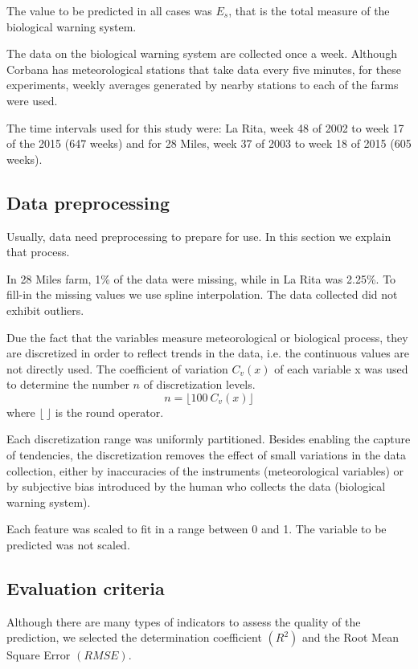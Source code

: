 \documentclass[review,authoryear,english]{elsarticle}
\begin{document}
The value to be predicted in all cases was $E_s$, that is the total measure of the biological warning system.  

The data on the biological warning system are collected once a week. Although Corbana has meteorological stations that take data every five minutes, for these experiments, weekly averages generated by nearby stations to each of the farms were used.

The time intervals used for this study were: La Rita, week 48 of 2002 to week 17 of the 2015 (647 weeks) and for 28 Miles, week 37 of 2003 to week 18 of 2015 (605 weeks).

\subsection{Data preprocessing}
Usually, data need preprocessing to prepare for use. In this section we explain that process.

In 28 Miles farm, 1\% of the data were missing, while in La Rita was 2.25\%. To fill-in the missing values we use spline interpolation. The data collected did not exhibit outliers.

Due the fact that the variables measure meteorological or biological process, they are discretized in order to reflect trends in the data, i.e. the continuous values are not directly used. The coefficient of variation $C_v(x)$ of each variable x was used to determine the number $n$ of discretization levels.
$$n= \lfloor 100 \ C_v(x) \rfloor$$
where $\lfloor \ \rfloor$  is the round operator.

Each discretization range was uniformly partitioned. Besides enabling the capture of tendencies, the discretization removes the effect of small variations in the data collection, either by inaccuracies of the instruments (meteorological variables) or by subjective bias introduced by the human who collects the data (biological warning system). 

Each feature was scaled to fit in a range between 0 and 1. The variable to be predicted was not scaled.

\subsection{Evaluation criteria}

Although there are many types of indicators to assess the quality of the prediction, we selected the determination coefficient $(R^2)$ and the Root Mean Square Error $(RMSE)$.  
\end{document}
